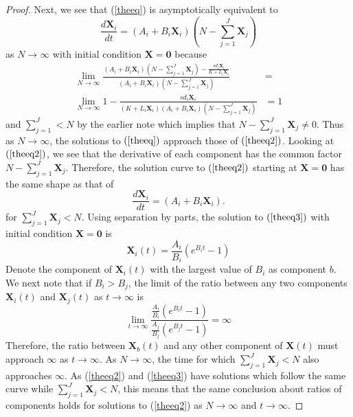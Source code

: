 \documentclass{article}
\begin{document}
\begin{proof}
  Next, we see that (\ref{theeq}) is asymptotically equivalent to
  \begin{equation}
    \frac{d\mathbf{X}_i}{dt} = (A_i + B_i \mathbf{X}_i)\left(N-\sum_{j=1}^J \mathbf{X}_j\right)
    \label{theeq2}
  \end{equation}
  as $N \rightarrow \infty$ with initial condition $\mathbf{X} = \mathbf{0}$ because
  \begin{align}
    \lim_{N \rightarrow \infty} \frac{(A_i + B_i\mathbf{X}_i)\left(N - \sum_{j=1}^J\mathbf{X}_j\right) - \frac{sd_i\mathbf{X}_i}{K+L_i\mathbf{X}_i}}{ (A_i + B_i \mathbf{X}_i)\left(N-\sum_{j=1}^J \mathbf{X}_j\right)} &= \\
    \lim_{N\rightarrow\infty} 1 - \frac{sd_i\mathbf{X}_i}{(K+L_i\mathbf{X}_i)(A_i+B_i\mathbf{X}_i)(N - \sum_{j=1}^J\mathbf{X}_j)} &= 1
        \label{theeqratio}
  \end{align}
  and $\sum_{j=1}^J < N$ by the earlier note which implies that $N - \sum_{j=1}^J \mathbf{X}_j \ne 0$. Thus as $N \rightarrow \infty$, the solutions to $(\ref{theeq})$ approach those of $(\ref{theeq2})$. Looking at $(\ref{theeq2})$, we see that the derivative of each component has the common factor $N - \sum_{j=1}^J \mathbf{X}_j$. Therefore, the solution curve to $(\ref{theeq2})$ starting at $\mathbf{X} = \mathbf{0}$ has the same shape as that of
  \begin{equation}
    \frac{d \mathbf{X}_i}{dt} = (A_i + B_i\mathbf{X}_i).
    \label{theeq3}
  \end{equation}
  for $\sum_{j=1}^J \mathbf{X}_j < N$. Using separation by parts, the solution to $(\ref{theeq3})$ with initial condition $\mathbf{X} = \mathbf{0}$ is
  \begin{equation}
    \mathbf{X}_i(t) = \frac{A_i}{B_i}\left(e^{B_it}-1\right)
    \label{xsol}
  \end{equation}
  Denote the component of $\mathbf{X}_i(t)$ with the largest value of $B_i$ as component $b$. We next note that if $B_i > B_j$, the limit of the ratio between any two components $\mathbf{X}_i(t)$ and $\mathbf{X}_j(t)$ as $t \rightarrow \infty$ is
  \begin{equation}
    \lim_{t \rightarrow \infty} \frac{ \frac{A_i}{B_i}\left(e^{B_it}-1\right)} {\frac{A_j}{B_j}\left(e^{B_jt}-1\right)
} = \infty
    \label{ratio}
  \end{equation}
  Therefore, the ratio between $\mathbf{X}_b(t)$ and any other component of $\mathbf{X}(t)$ must approach $\infty$ as $t \rightarrow \infty$. As $N \rightarrow \infty$, the time for which $\sum_{j=1}^J \mathbf{X}_j < N$ also approaches $\infty$. As (\ref{theeq2}) and (\ref{theeq3}) have solutions which follow the same curve while $\sum_{j=1}^J \mathbf{X}_j < N$, this means that the same conclusion about ratios of components holds for solutions to (\ref{theeq2}) as $N \rightarrow \infty$ and $t \rightarrow \infty$.


\end{proof}
\end{document}
